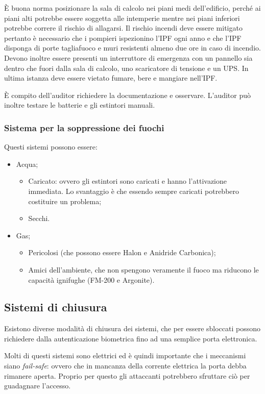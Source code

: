 È buona norma posizionare la sala di calcolo nei piani medi
dell'edificio, perché ai piani alti potrebbe essere soggetta alle
intemperie mentre nei piani inferiori potrebbe correre il rischio
di allagarsi.
Il rischio incendi deve essere mitigato pertanto è necessario
che i pompieri ispezionino l'IPF ogni anno e che l'IPF disponga
di porte tagliafuoco e muri resistenti almeno due ore in
caso di incendio.
Devono inoltre essere presenti un interruttore di emergenza con un
pannello sia dentro che fuori dalla sala di calcolo, uno scaricatore di 
tensione e un UPS.
In ultima istanza deve essere vietato fumare, bere e mangiare nell'IPF.

È compito dell'auditor richiedere la documentazione e osservare.
L'auditor può inoltre testare le batterie e gli estintori manuali.

\subsubsection{Sistema per la soppressione dei fuochi}

Questi sistemi possono essere:
\begin{itemize}
\item Acqua;
\begin{itemize}
\item Caricato: ovvero gli estintori sono caricati e hanno l'attivazione
immediata. Lo svantaggio è che essendo sempre caricati potrebbero costituire un
problema;
\item Secchi.
\end{itemize}
\item Gas;
\begin{itemize}
\item Pericolosi (che possono essere Halon e Anidride Carbonica);
\item Amici dell'ambiente, che non spengono veramente il fuoco ma riducono le
capacità ignifughe (FM-200 e Argonite).
\end{itemize}
\end{itemize}

\subsection{Sistemi di chiusura}

Esistono diverse modalità di chiusura dei sistemi, che per essere sbloccati
possono richiedere dalla autenticazione biometrica fino ad una semplice
porta elettronica.

Molti di questi sistemi sono elettrici ed è quindi importante che i
meccanismi siano \textit{fail-safe}: ovvero che in mancanza della corrente
elettrica la porta debba rimanere aperta. Proprio per questo gli attaccanti
potrebbero sfruttare ciò per guadagnare l'accesso.

